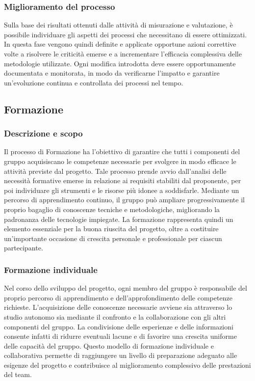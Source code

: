 \documentclass[a4paper,12pt]{article}
\begin{document}
        \subsubsection{Miglioramento del processo}
            Sulla base dei risultati ottenuti dalle attività di misurazione e valutazione, è possibile individuare gli aspetti dei processi che necessitano di essere ottimizzati.
            In questa fase vengono quindi definite e applicate opportune azioni correttive volte a risolvere le criticità emerse e a incrementare l'efficacia complessiva delle metodologie utilizzate.
            Ogni modifica introdotta deve essere opportunamente documentata e monitorata, in modo da verificarne l'impatto e garantire un'evoluzione continua e controllata dei processi nel tempo.

    \subsection{Formazione}
        \subsubsection{Descrizione e scopo}
            Il processo di Formazione ha l'obiettivo di garantire che tutti i componenti del gruppo acquisiscano le competenze necessarie per svolgere in modo efficace le attività previste dal progetto.
            Tale processo prende avvio dall'analisi delle necessità formative emerse in relazione ai requisiti stabiliti dal proponente, per poi individuare gli strumenti e le risorse più idonee a soddisfarle.
            Mediante un percorso di apprendimento continuo, il gruppo può ampliare progressivamente il proprio bagaglio di conoscenze tecniche e metodologiche, migliorando la padronanza delle tecnologie impiegate.
            La formazione rappresenta quindi un elemento essenziale per la buona riuscita del progetto, oltre a costituire un'importante occasione di crescita personale e professionale per ciascun partecipante.

        \subsubsection{Formazione individuale}
            Nel corso dello sviluppo del progetto, ogni membro del gruppo è responsabile del proprio percorso di apprendimento e dell'approfondimento delle competenze richieste.
            L'acquisizione delle conoscenze necessarie avviene sia attraverso lo studio autonomo sia mediante il confronto e la collaborazione con gli altri componenti del gruppo.
            La condivisione delle esperienze e delle informazioni consente infatti di ridurre eventuali lacune e di favorire una crescita uniforme delle capacità del gruppo.
            Questo modello di formazione individuale e collaborativa permette di raggiungere un livello di preparazione adeguato alle esigenze del progetto e contribuisce al miglioramento complessivo delle prestazioni del team.
\end{document}
